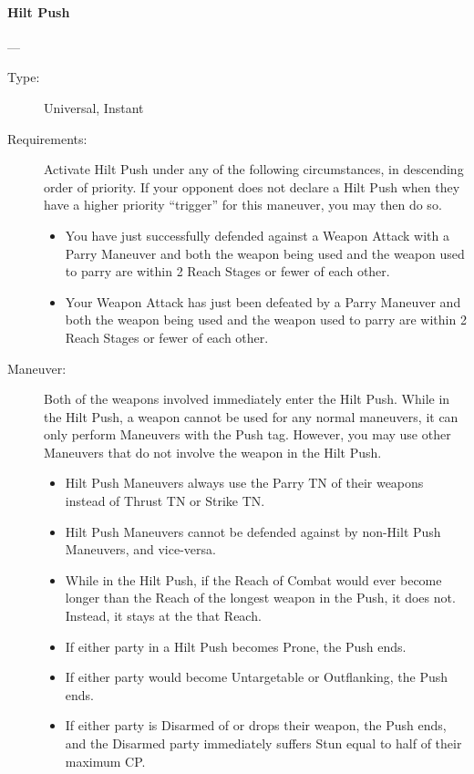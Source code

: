 \documentclass[oneside,11pt,english]{book}
\begin{document}
\paragraph{\large\label{man:Hilt Push}Hilt Push}---\quad{\large[2]}
\vspace{-10pt}\begin{description}
\item [Type:] Universal, Instant 
\item [Requirements:] Activate Hilt Push under any of the following circumstances, in descending order of 
  priority. If your opponent does not declare a Hilt Push when they have a higher priority “trigger” for this 
  maneuver, you may then do so.
  \begin{itemize}
  \item You have just successfully defended against a Weapon Attack with a Parry Maneuver and both the 
    weapon being used and the weapon used to parry are within 2 Reach Stages or fewer of each other. 
  \item Your Weapon Attack has just been defeated by a Parry Maneuver and both the weapon being used and 
    the weapon used to parry are within 2 Reach Stages or fewer of each other.
  \end{itemize}
\item [Maneuver:] Both of the weapons involved immediately enter the Hilt Push. 
  While in the Hilt Push, a weapon cannot be used for any normal maneuvers, it can only perform 
  Maneuvers with the Push tag. However, you may use other Maneuvers that do not involve the weapon in 
  the Hilt Push.
  \begin{itemize}
  \item Hilt Push Maneuvers always use the Parry TN of their weapons instead of Thrust TN or Strike TN. 
  \item Hilt Push Maneuvers cannot be defended against by non-Hilt Push Maneuvers, and vice-versa. 
  \item While in the Hilt Push, if the Reach of Combat would ever become longer than the Reach of the longest 
    weapon in the Push, it does not. Instead, it stays at the that Reach. 
  \item If either party in a Hilt Push becomes Prone, the Push ends. 
  \item If either party would become Untargetable or Outflanking, the Push ends. 
  \item If either party is Disarmed of or drops their weapon, the Push ends, and the Disarmed party immediately 
    suffers Stun equal to half of their maximum CP. 

\end{itemize}
\end{description}
\end{document}
